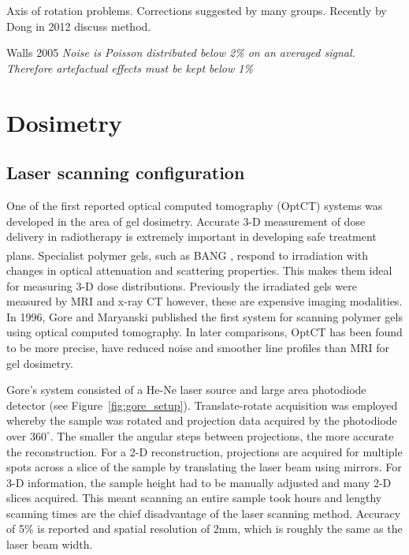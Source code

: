 \documentclass[12pt]{article}
\begin{document}
Axis of rotation problems. Corrections suggested by many groups. Recently by Dong in 2012 \cite{Dong:2012}  discuss method.

Walls 2005 \textit{Noise is Poisson distributed below 2\% on an averaged signal. Therefore artefactual effects must be kept below 1\%}


\newpage
\section{Dosimetry}
\label{sec:dos}
\subsection{Laser scanning configuration}


One of the first reported optical computed tomography (OptCT) systems was developed in the area of gel dosimetry. Accurate 3-D measurement of dose delivery in radiotherapy is extremely important in developing safe treatment plans. Specialist polymer gels, such as BANG\textsuperscript{\textregistered} \cite{Maryanski:1996}, respond to irradiation with changes in optical attenuation and scattering properties.  This makes them ideal for measuring 3-D dose distributions. Previously the irradiated gels were measured by MRI and x-ray CT however, these are expensive imaging modalities. In 1996, Gore and Maryanski published the first system for scanning polymer gels using optical computed tomography. \cite{Gore:1999tg} In later comparisons, OptCT has been found to be more precise, have reduced noise and smoother line profiles than MRI for gel dosimetry. \cite{Oldham:2001gs}

Gore's system consisted of a  He-Ne laser source and large area photodiode detector (see Figure~\ref{fig:gore_setup}). Translate-rotate acquisition was employed whereby the sample was rotated and projection data  acquired  by the photodiode over $360^{\circ}$. The smaller the angular steps between projections, the more accurate the reconstruction. \cite{russ2002image} For a 2-D reconstruction, projections are acquired for multiple spots across a slice of the sample by translating the laser beam using mirrors. For 3-D information, the sample height  had to be manually adjusted and many 2-D slices acquired. This meant scanning an entire sample took  hours and lengthy scanning times are the chief disadvantage of the laser scanning method.  Accuracy of 5\% is reported and spatial resolution of 2mm, which is roughly the same as the laser beam width. \cite{Gore:1999tg}
\end{document}
